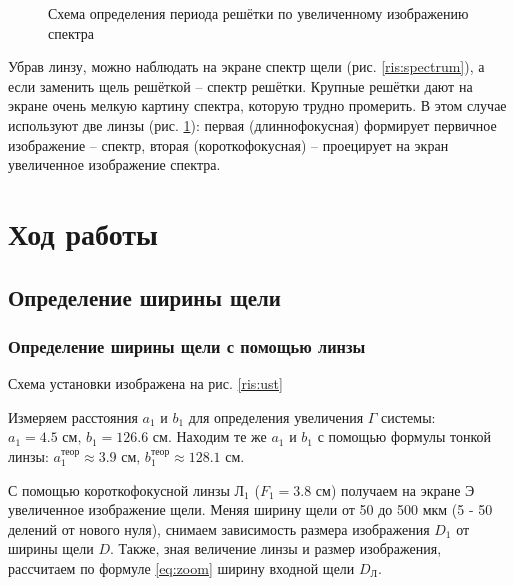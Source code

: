 \documentclass[a5paper,10pt, twoside]{article} %
\begin{document}
\begin{figure}[h]\label{ris:d_per}
	\caption{Схема определения периода решётки по увеличенному изображению спектра}
\end{figure}

Убрав линзу, можно наблюдать на экране спектр щели (рис. \ref{ris:spectrum}), а если заменить 
щель решёткой -- спектр решётки. Крупные решётки дают на экране очень мелкую картину спектра, 
которую трудно промерить. В этом случае используют две линзы (рис. \ref{ris:d_per}): первая 
(длиннофокусная) формирует первичное изображение -- спектр, вторая (короткофокусная) -- 
проецирует на экран увеличенное изображение спектра.




\section{Ход работы}

\subsection{Определение ширины щели}

\subsubsection{Определение ширины щели с помощью линзы}

	Схема установки изображена на рис. \ref{ris:ust}

	Измеряем расстояния $a_1$ и $b_1$ для определения увеличения $\Gamma$ системы: 
	$ a_1 = 4.5 \text{ см, } b_1 = 126.6 \text{ см} $. Находим те же $a_1$ и $b_1$ с помощью формулы 
	тонкой линзы: 
	$ a_1^{\text{теор}} \approx 3.9 \text{ см, } b_1^{\text{теор}} \approx 128.1 \text{ см} $.

	С помощью короткофокусной линзы $\text{Л}_1$ ($F_1 = 3.8$ см) получаем на экране $\text{Э}$
	увеличенное изображение щели. Меняя ширину щели от 50 до 500 мкм (5 - 50 делений от нового нуля), 
	снимаем зависимость размера изображения $D_1$ от ширины щели $D$. Также, зная величение линзы и
	размер изображения, рассчитаем по формуле \eqref{eq:zoom} ширину входной щели $D_{\text{Л}}$.
\end{document}
